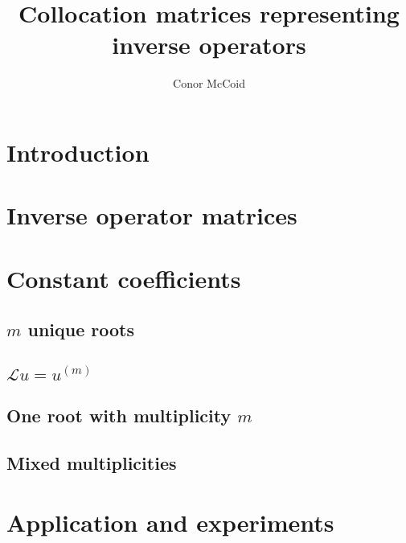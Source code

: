 \documentclass{article}
\title{Collocation matrices representing inverse operators}
\author{Conor McCoid}
\begin{document}
\maketitle

\section{Introduction}


\section{Inverse operator matrices}

\section{Constant coefficients}

\subsection{$m$ unique roots}

\subsection{$\mathcal{L} u = u^{(m)}$}

\subsection{One root with multiplicity $m$}

\subsection{Mixed multiplicities}

\section{Application and experiments}
\end{document}
